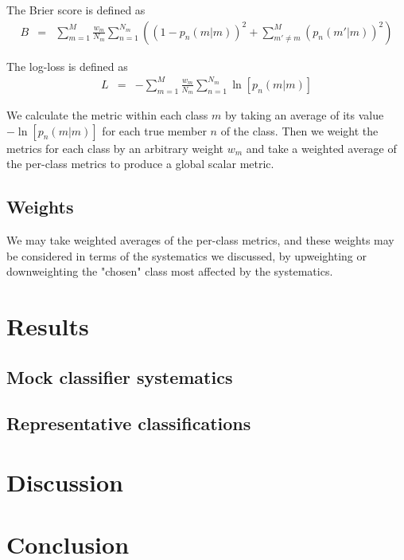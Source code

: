 \documentclass[\docopts]{\docclass}
\begin{document}
The Brier score is defined as
\begin{eqnarray}
B &=& \sum_{m=1}^{M}\frac{w_{m}}{N_{m}}\sum_{n=1}^{N_{m}}\left((1-p_{n}(m | m))^{2}+\sum_{m'\neq m}^{M}(p_{n}(m' | m))^{2}\right)
\end{eqnarray}

The log-loss is defined as
\begin{eqnarray}
L &=& -\sum_{m=1}^{M}\frac{w_{m}}{N_{m}}\sum_{n=1}^{N_{m}}\ln[p_{n}(m | m)]
\end{eqnarray}

We calculate the metric within each class $m$ by taking an average of its value $-\ln[p_{n}(m | m)]$ for each true member $n$ of the class.  Then we weight the metrics for each class by an arbitrary weight $w_{m}$ and take a weighted average of the per-class metrics to produce a global scalar metric.

\subsection{Weights}
\label{sec:weights}

We may take weighted averages of the per-class metrics, and these weights may be considered in terms of the systematics we discussed, by upweighting or downweighting the "chosen" class most affected by the systematics.

\section{Results}
\label{sec:results}

\subsection{Mock classifier systematics}
\label{sec:mockresults}

\subsection{Representative classifications}
\label{sec:realresults}

\section{Discussion}
\label{sec:discussion}




\section{Conclusion}
\label{sec:conclusion}
\end{document}
